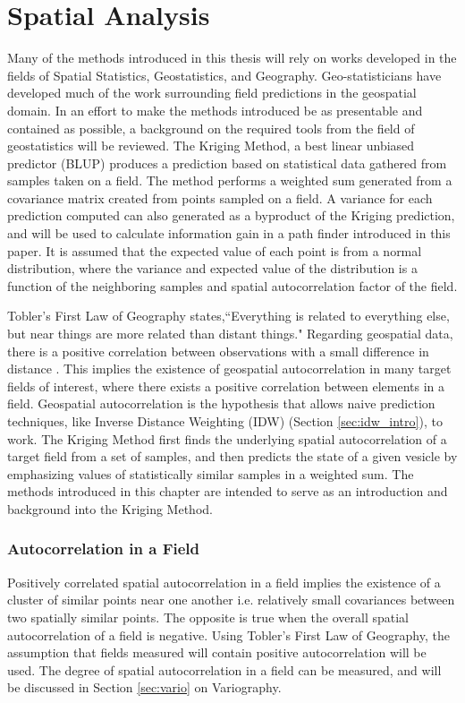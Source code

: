 \chapter{Spatial Analysis}
Many of the methods introduced in this thesis will rely on works developed in the fields of Spatial Statistics, Geostatistics, and Geography. Geo-statisticians have developed much of the work surrounding field predictions in the geospatial domain. In an effort to make the methods introduced be as presentable and contained as possible, a background on the required tools from the field of geostatistics will be reviewed. The Kriging Method, a best linear unbiased predictor (BLUP) produces a prediction based on statistical data gathered from samples taken on a field. The method performs a weighted sum generated from a covariance matrix created from points sampled on a field. A variance for each prediction computed can also generated as a byproduct of the Kriging prediction, and will be used to calculate information gain in a path finder introduced in this paper. It is assumed that the expected value of each point is from a normal distribution, where the variance and expected value of the distribution is a function of the neighboring samples and spatial autocorrelation factor of the field.

Tobler's First Law of Geography \cite{tobler:first_law} states,``Everything is related to everything else, but near things are more related than distant things." Regarding geospatial data, there is a positive correlation between observations with a small difference in distance \cite{miller:on_toblers_first_law}. This implies the existence of geospatial autocorrelation in many target fields of interest, where there exists a positive correlation between elements in a field. Geospatial autocorrelation is the hypothesis that allows naive prediction techniques, like Inverse Distance Weighting (IDW) (Section \ref{sec:idw_intro}), to work. The Kriging Method first finds the underlying spatial autocorrelation of a target field from a set of samples, and then predicts the state of a given vesicle by emphasizing values of statistically similar samples in a weighted sum. The methods introduced in this chapter are intended to serve as an introduction and background into the Kriging Method.

\subsection{Autocorrelation in a Field}
Positively correlated spatial autocorrelation in a field implies the existence of a cluster of similar points near one another i.e. relatively small covariances between two spatially similar points. The opposite is true when the overall spatial autocorrelation of a field is negative. Using Tobler's First Law of Geography, the assumption that fields measured will contain positive autocorrelation will be used. The degree of spatial autocorrelation in a field can be measured, and will be discussed in Section \ref{sec:vario} on Variography.

